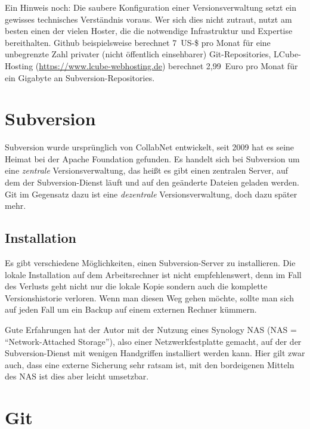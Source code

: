 Ein Hinweis noch: Die saubere Konfiguration einer Versionsverwaltung setzt ein gewisses technisches Verständnis voraus. Wer sich dies nicht zutraut, nutzt am besten einen der vielen Hoster, die die notwendige Infrastruktur und Expertise bereithalten. Github beispielsweise berechnet 7~US-\$ pro Monat für eine unbegrenzte Zahl privater (nicht öffentlich einsehbarer) Git-Repositories, LCube-Hosting (\url{https://www.lcube-webhosting.de}) berechnet 2,99~Euro pro Monat für ein Gigabyte an Subversion-Repositories.

\section{Subversion}

Subversion wurde ursprünglich von CollabNet entwickelt, seit 2009 hat es seine Heimat bei der Apache Foundation gefunden. Es handelt sich bei Subversion um eine \textit{zentrale} Versionsverwaltung, das heißt es gibt einen zentralen Server, auf dem der Subversion-Dienst läuft und auf den geänderte Dateien geladen werden. Git im Gegensatz dazu ist eine \textit{dezentrale} Versionsverwaltung, doch dazu später mehr.

\subsection{Installation}

Es gibt verschiedene Möglichkeiten, einen Subversion-Server zu installieren. Die lokale Installation auf dem Arbeitsrechner ist nicht empfehlenswert, denn im Fall des Verlusts geht nicht nur die lokale Kopie sondern auch die komplette Versionshistorie verloren. Wenn man diesen Weg gehen möchte, sollte man sich auf jeden Fall um ein Backup auf einem externen Rechner kümmern. 

Gute Erfahrungen hat der Autor mit der Nutzung eines Synology NAS (NAS = \enquote{Network-Attached Storage}), also einer Netzwerkfestplatte gemacht, auf der der Subversion-Dienst mit wenigen Handgriffen installiert werden kann. Hier gilt zwar auch, dass eine externe Sicherung sehr ratsam ist, mit den bordeigenen Mitteln des NAS ist dies aber leicht umsetzbar.




\section{Git}


\endinput

Die aus Sicht des Autors beste Lösung ist daher eine Sicherung außerhalb des lokalen Rechners, idealerweise auch auf einem anderen Dateisystem. Der Grund hierfür ist technisch: Es sind Fälle bekannt, in denen Trojaner nicht nur die lokalen Dateien sondern auch alle Dateien auf angeschlossenen Netzlaufwerken verschlüsselten. Eine Sicherung auf einer Netzwerkfreigabe kann daher auch zu wenig sein. 



